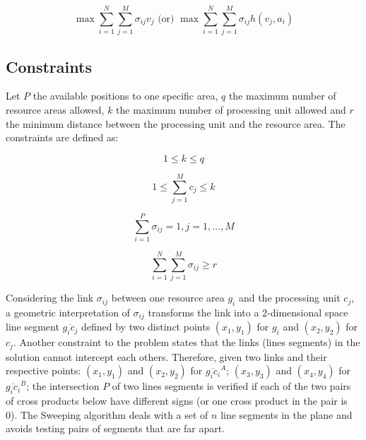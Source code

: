 \documentclass{llncs}
\begin{document}
\begin{equation}
\max \sum\limits_{i=1}^{N} \sum\limits_{j=1}^{M} \sigma_{ij}v_j
\text{  (or)  }
\max \sum\limits_{i=1}^{N} \sum\limits_{j=1}^{M} \sigma_{ij} h(v_j, a_i)
\end{equation}


\subsection{Constraints}

Let $P$ the available positions to one specific area, $q$ the maximum number of  resource areas allowed, $k$ the maximum number of  processing  unit allowed and $r$ the minimum distance between the processing unit and the resource area. The constraints are defined as:   

\begin{equation}
 1 \leq k \leq  q
\end{equation}


\begin{equation}
 1 \leq \sum\limits_{j=1}^{M} c_j \leq k
\end{equation}



  
\begin{equation}
\sum\limits_{i=1}^{P} \sigma_{ij}=1, j=1,\ldots,M
\end{equation}


\begin{equation}
 \sum\limits_{i=1}^{N} \sum\limits_{j=1}^{M} \sigma_{ij}\geq r
\end{equation}

Considering the link $\sigma_{ij}$ between one resource area $g_i$ and the processing unit $c_j$, a geometric interpretation of  $\sigma_{ij}$ transforms the link into a $2$-dimensional space line segment $\overline{g_ic_j}$ defined by two distinct points $\left(x_1,y_1\right)$ for $g_i$  and $\left(x_2,y_2\right)$ for $c_j$. Another constraint to the problem states that the links (lines segments) in the solution cannot intercept each others. Therefore, given two links and their respective points: $\left(x_1,y_1\right)$ and $\left(x_2,y_2\right)$ for $\overline{g_ic_i}^A$; $\left(x_3,y_3\right)$ and $\left(x_4,y_4\right)$ for $\overline{g_ic_i}^B$; the intersection $P$ of two lines segments is verified if each of the two pairs of cross products below have different signs (or one cross product in the pair is 0).  The Sweeping algorithm \cite{Berg:2008:CGA:1370949} deals with a set of $n$ line segments in the plane and avoids testing pairs of segments that are far apart.
\end{document}
